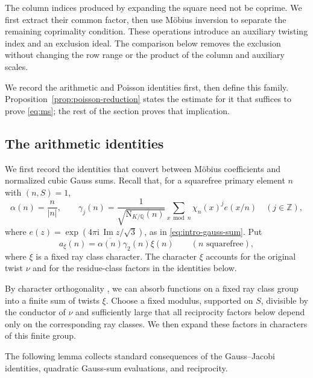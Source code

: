 \documentclass[11pt,a4paper]{article}
\numberwithin{equation}{section}
\numberwithin{figure}{section}
\theoremstyle{definition}
\theoremstyle{remark}
\newcommand{\Q}{\mathbb Q}
\newcommand{\NK}{\mathrm N_{K/\Q}}
\begin{document}
The column indices produced by expanding the square need not be
coprime. We first extract their common factor, then use M\"obius
inversion to separate the remaining coprimality condition. These
operations introduce an auxiliary twisting index and an exclusion
ideal. The comparison below removes the exclusion without changing
the row range or the product of the column and auxiliary scales.

We record the arithmetic and Poisson identities first, then define
this family. Proposition~\ref{prop:poisson-reduction} states the
estimate for it that suffices to prove \eqref{eq:ms}; the rest of
the section proves that implication.

\subsection{The arithmetic identities}
We first record the identities that convert between M\"obius
coefficients and normalized cubic Gauss sums. Recall that, for a
squarefree primary element $n$ with $(n,S)=1$,
\[
 \alpha(n)=\frac{n}{|n|},\qquad
 \gamma_j(n)=\frac{1}{\sqrt{\NK(n)}}
       \sum_{x\bmod n}\chi_n(x)^j e(x/n)\quad(j\in\mathbb Z),
\]
where $e(z)=\exp(4\pi\mathrm i\,\operatorname{Im}z/\sqrt3)$, as in
\eqref{eq:intro-gauss-sum}. Put
\[
 a_\xi(n)=\overline{\alpha(n)}\gamma_2(n)\xi(n)
 \qquad(n\text{ squarefree}),
\]
where $\xi$ is a fixed ray class character. The character $\xi$ accounts for the original
twist $\nu$ and for the residue-class factors in the identities below.

By character orthogonality \cite[\S3.1]{IK04}, we can absorb functions
on a fixed ray class group into a finite sum of twists $\xi$.
Choose a fixed modulus, supported on $S$, divisible by the conductor
of $\nu$ and sufficiently large that all reciprocity factors below
depend only on the corresponding ray classes. We then expand these
factors in characters of this finite group.

The following lemma collects standard consequences of the Gauss--Jacobi
identities, quadratic Gauss-sum evaluations, and reciprocity.
\end{document}
